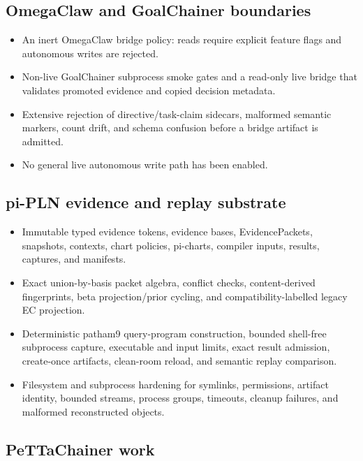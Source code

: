 \documentclass[11pt]{article}
\begin{document}
\subsection{OmegaClaw and GoalChainer boundaries}

\begin{itemize}
\item An inert OmegaClaw bridge policy: reads require explicit feature flags and
autonomous writes are rejected.
\item Non-live GoalChainer subprocess smoke gates and a read-only live bridge
that validates promoted evidence and copied decision metadata.
\item Extensive rejection of directive/task-claim sidecars, malformed semantic
markers, count drift, and schema confusion before a bridge artifact is admitted.
\item No general live autonomous write path has been enabled.
\end{itemize}

\subsection{pi-PLN evidence and replay substrate}

\begin{itemize}
\item Immutable typed evidence tokens, evidence bases, EvidencePackets,
snapshots, contexts, chart policies, pi-charts, compiler inputs, results,
captures, and manifests.
\item Exact union-by-basis packet algebra, conflict checks, content-derived
fingerprints, beta projection/prior cycling, and compatibility-labelled legacy
EC projection.
\item Deterministic patham9 query-program construction, bounded shell-free
subprocess capture, executable and input limits, exact result admission,
create-once artifacts, clean-room reload, and semantic replay comparison.
\item Filesystem and subprocess hardening for symlinks, permissions, artifact
identity, bounded streams, process groups, timeouts, cleanup failures, and
malformed reconstructed objects.
\end{itemize}

\subsection{PeTTaChainer work}
\end{document}

